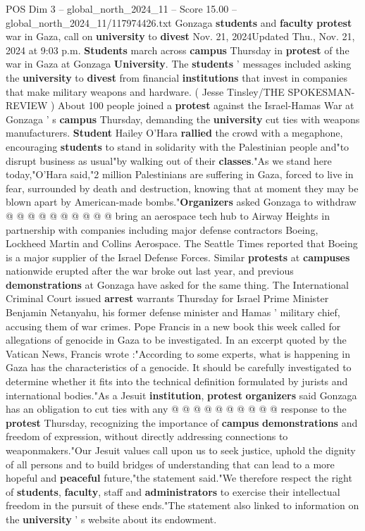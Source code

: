 \begin{textsample}{POS Dim 3 – global\_north\_2024\_11 – Score 15.00 – global\_north\_2024\_11/117974426.txt}  \label{ex:f3_pos_185}
Gonzaga \textbf{students} and \textbf{faculty} \textbf{protest} war in Gaza, call on \textbf{university} to \textbf{divest} Nov. 21, 2024Updated Thu., Nov. 21, 2024 at 9:03 p.m. \textbf{Students} march across \textbf{campus} Thursday in \textbf{protest} of the war in Gaza at Gonzaga \textbf{University}.
The \textbf{students} ' messages included asking the \textbf{university} to \textbf{divest} from financial \textbf{institutions} that invest in companies that make military weapons and hardware. ( Jesse Tinsley/THE SPOKESMAN-REVIEW ) About 100 people joined a \textbf{protest} against the Israel-Hamas War at Gonzaga ' s \textbf{campus} Thursday, demanding the \textbf{university} cut ties with weapons manufacturers. \textbf{Student} Hailey O'Hara \textbf{rallied} the crowd with a megaphone, encouraging \textbf{students} to stand in solidarity with the Palestinian people and"to disrupt business as usual"by walking out of their \textbf{classes}."As we stand here today,"O'Hara said,"2 million Palestinians are suffering in Gaza, forced to live in fear, surrounded by death and destruction, knowing that at moment they may be blown apart by American-made bombs."\textbf{Organizers} asked Gonzaga to withdraw @ @ @ @ @ @ @ @ @ @ bring an aerospace tech hub to Airway Heights in partnership with companies including major defense contractors Boeing, Lockheed Martin and Collins Aerospace.
The Seattle Times reported that Boeing is a major supplier of the Israel Defense Forces.
Similar \textbf{protests} at \textbf{campuses} nationwide erupted after the war broke out last year, and previous \textbf{demonstrations} at Gonzaga have asked for the same thing.
The International Criminal Court issued \textbf{arrest} warrants Thursday for Israel Prime Minister Benjamin Netanyahu, his former defense minister and Hamas ' military chief, accusing them of war crimes.
Pope Francis in a new book this week called for allegations of genocide in Gaza to be investigated.
In an excerpt quoted by the Vatican News, Francis wrote :"According to some experts, what is happening in Gaza has the characteristics of a genocide.
It should be carefully investigated to determine whether it fits into the technical definition formulated by jurists and international bodies."As a Jesuit \textbf{institution}, \textbf{protest} \textbf{organizers} said Gonzaga has an obligation to cut ties with any @ @ @ @ @ @ @ @ @ @ response to the \textbf{protest} Thursday, recognizing the importance of \textbf{campus} \textbf{demonstrations} and freedom of expression, without directly addressing connections to weaponmakers."Our Jesuit values call upon us to seek justice, uphold the dignity of all persons and to build bridges of understanding that can lead to a more hopeful and \textbf{peaceful} future,"the statement said."We therefore respect the right of \textbf{students}, \textbf{faculty}, staff and \textbf{administrators} to exercise their intellectual freedom in the pursuit of these ends."The statement also linked to information on the \textbf{university} ' s website about its endowment.

\end{textsample}
